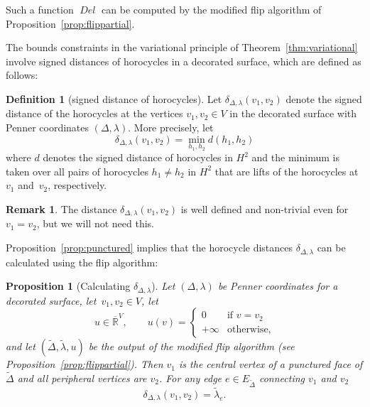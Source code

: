 \documentclass[a4paper, 11pt]{article}
\newcommand{\R}{\mathbb{R}}
\newcommand{\Rbar}{\overline{\R}}
\newcommand{\Deltil}{\widetilde{\Delta}}
\newcommand{\lamtil}{\tilde{\lambda}}
\newcommand{\Del}{\operatorname{\textit{Del}}}
\theoremstyle{plain}
\newtheorem{proposition}[theorem]{Proposition}
\theoremstyle{definition}
\newtheorem{definition}[theorem]{Definition}
\newtheorem{remark}[theorem]{Remark}
\begin{document}
Such a function $\Del$ can be computed by the modified flip algorithm
of Proposition~\ref{prop:flippartial}.

The bounds constraints in the variational principle of
Theorem~\ref{thm:variational} involve signed distances of horocycles in a
decorated surface, which are defined as follows:

\begin{definition}[signed distance of horocycles]
  \label{def:delta}
  Let $\delta_{\Delta,\lambda}(v_{1},v_{2})$ denote the signed
  distance of the horocycles at the vertices $v_{1},v_{2}\in V$ in the
  decorated surface with Penner coordinates $(\Delta,\lambda)$. More
  precisely, let
  \begin{equation}
    \label{eq:delta}
    \delta_{\Delta,\lambda}(v_{1},v_{2})=\min_{h_{1},h_{2}}d(h_{1},h_{2})
  \end{equation}
  where $d$ denotes the signed distance of horocycles in $H^{2}$ and
  the minimum is taken over all pairs of horocycles $h_{1}\not=h_{2}$
  in $H^{2}$ that are lifts of the horocycles at $v_{1}$ and~$v_{2}$,
  respectively.
\end{definition}

\begin{remark}
  The distance $\delta_{\Delta,\lambda}(v_{1},v_{2})$ is well defined
  and non-trivial even for $v_{1}=v_{2}$, but we will not need this.
\end{remark}

Proposition~\ref{prop:punctured} implies that the horocycle distances
$\delta_{\Delta,\lambda}$ can be calculated using the flip algorithm:

\begin{proposition}[Calculating $\delta_{\Delta,\lambda}$]
  \label{prop:calcdelta}
  Let $(\Delta,\lambda)$ be Penner coordinates for a decorated surface,
  let~$v_{1},v_{2}\in V$, let 
    \begin{equation*}
    u\in\Rbar^{V},\qquad
    u(v)=
    \begin{cases}
      0 & \text{if }v=v_{2}\\
      +\infty & \text{otherwise},
    \end{cases}
  \end{equation*}
  and let $(\Deltil,\lamtil,u)$ be the output of the modified flip
  algorithm (see Proposition~\ref{prop:flippartial}). Then $v_{1}$ is
  the central vertex of a punctured face of $\Deltil$ and all
  peripheral vertices are $v_{2}$. For any edge $e\in E_{\Deltil}$
  connecting $v_{1}$ and $v_{2}$
  \begin{equation*}
    \delta_{\Delta,\lambda}(v_{1},v_{2})=\lamtil_{e}.
  \end{equation*}
\end{proposition}
\end{document}
